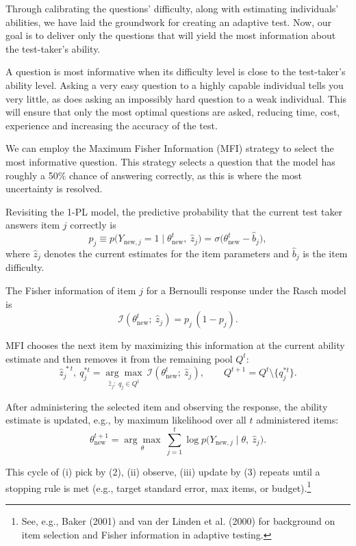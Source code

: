 \documentclass{article}
\begin{document}
Through calibrating the questions' difficulty, along with estimating individuals' abilities, we have laid the groundwork for creating an adaptive test. Now, our goal is to deliver only the questions that will yield the most information about the test-taker's ability.

A question is most informative when its difficulty level is close to the test-taker's ability level. Asking a very easy question to a highly capable individual tells you very little, as does asking an impossibly hard question to a weak individual. This will ensure that only the most optimal questions are asked, reducing time, cost, experience and increasing the accuracy of the test.

We can employ the Maximum Fisher Information (MFI) strategy to select the most informative question. This strategy selects a question that the model has roughly a 50\% chance of answering correctly, as this is where the most uncertainty is resolved.

Revisiting the 1-PL model, the predictive probability that the current test taker answers item $j$ correctly is
\[
p_j \equiv p\big(Y_{\text{new},j}=1\mid \theta^{t}_{\text{new}},\ \hat z_j\big)
= \sigma\big(\theta^{t}_{\text{new}} - \hat b_j\big),
\]
where $\hat z_j$ denotes the current estimates for the item parameters and $\hat b_j$ is
the item difficulty.

The Fisher information of item $j$ for a Bernoulli response under the Rasch model is
\[
\mathcal I\!\left(\theta^{t}_{\text{new}};\ \hat z_j\right)
= p_j\,(1-p_j).
\tag{1}
\]

MFI chooses the next item by maximizing this information at the current ability estimate
and then removes it from the remaining pool $Q^t$:
\[
\hat z^{\,*t}_j,\ q^{*t}_j
= \underset{\hat z_j:\ q_j\in Q^t}{\arg\max}\ \mathcal I\!\left(\theta^{t}_{\text{new}};\ \hat z_j\right),
\qquad
Q^{t+1} = Q^t\setminus\{q^{*t}_j\}.
\tag{2}
\]

After administering the selected item and observing the response, the ability estimate is
updated, e.g., by maximum likelihood over all $t$ administered items:
\[
\theta^{t+1}_{\text{new}}
= \underset{\theta}{\arg\max}\ \sum_{j=1}^{t} \log p\big(Y_{\text{new},j}\mid \theta,\ \hat z_j\big).
\tag{3}
\]

This cycle of (i) pick by (2), (ii) observe, (iii) update by (3) repeats until a stopping
rule is met (e.g., target standard error, max items, or budget).\footnote{See, e.g.,
Baker (2001) and van der Linden et al. (2000) for background on item selection and Fisher
information in adaptive testing.}
\end{document}
